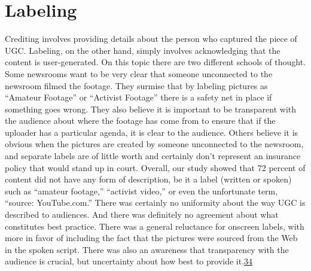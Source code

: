 \documentclass[symmetric, notoc, nobib]{towcenter-book}
\begin{document}
\chapter{Labeling}
Crediting involves providing details about the person who captured the
piece of UGC. Labeling, on the other hand, simply involves acknowledging
that the content is user-generated. On this topic there are two different
schools of thought. Some newsrooms want to be very clear that someone
unconnected to the newsroom filmed the footage. They surmise that by
labeling pictures as ``Amateur Footage'' or ``Activist Footage'' there is a safety
net in place if something goes wrong. They also believe it is important to
be transparent with the audience about where the footage has come from
to ensure that if the uploader has a particular agenda, it is clear to the audience.
Others believe it is obvious when the pictures are created by someone
unconnected to the newsroom, and separate labels are of little worth and
certainly don't represent an insurance policy that would stand up in court.
Overall, our study showed that 72 percent of content did not have any form
of description, be it a label (written or spoken) such as ``amateur footage,''
``activist video,'' or even the unfortunate term, ``source: YouTube.com.'' There
was certainly no uniformity about the way UGC is described to audiences.
And there was definitely no agreement about what constitutes best practice.
There was a general reluctance for onscreen labels, with more in favor of
including the fact that the pictures were sourced from the Web in the spoken
script. There was also an awareness that transparency with the audience
is crucial, but uncertainty about how best to provide it.{\href{#endnotes}{34}}
\end{document}
